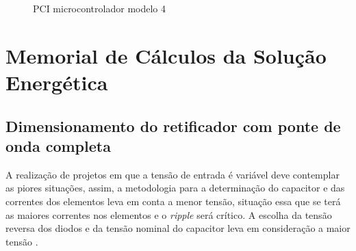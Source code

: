 \begin{apendicesenv}
\begin{figure}[H]
    \centering
    \caption{PCI microcontrolador modelo 4}\label{fig:PCB_micro4}
\end{figure}



\chapter{Memorial de Cálculos da Solução Energética}
\label{Energia_memorial}

\section{Dimensionamento do retificador com ponte de onda completa}

A realização de projetos em que a tensão de entrada é variável deve contemplar as piores situações, assim, a metodologia para a determinação do capacitor e das correntes dos elementos leva em conta a menor tensão, situação essa que se terá as maiores correntes nos elementos e o \textit{ripple} será crítico. A escolha da tensão reversa dos diodos e da tensão nominal do capacitor leva em consideração a maior tensão \cite{retificador}.


\end{apendicesenv}
